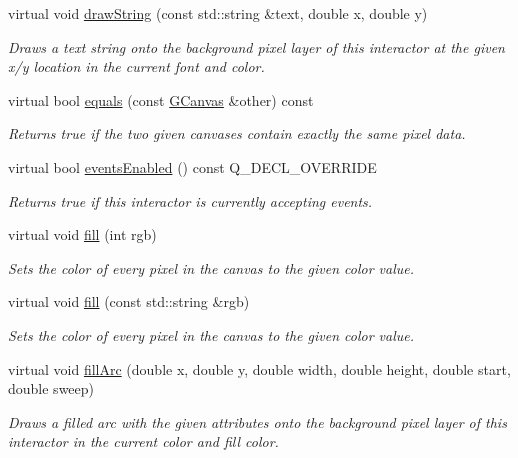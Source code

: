 \begin{DoxyCompactItemize}
virtual void \mbox{\hyperlink{classGDrawingSurface_ad4e8551a753a77135792bbee97013675}{draw\+String}} (const std\+::string \&text, double x, double y)
\begin{DoxyCompactList}\small\item\em Draws a text string onto the background pixel layer of this interactor at the given x/y location in the current font and color. \end{DoxyCompactList}\item 
virtual bool \mbox{\hyperlink{classGCanvas_a7cf0de4c4124b7de747b9cc17edd6ab9}{equals}} (const \mbox{\hyperlink{classGCanvas}{G\+Canvas}} \&other) const
\begin{DoxyCompactList}\small\item\em Returns true if the two given canvases contain exactly the same pixel data. \end{DoxyCompactList}\item 
virtual bool \mbox{\hyperlink{classGInteractor_ac05ba5b92e2e5146d416fe7f842a0969}{events\+Enabled}} () const Q\+\_\+\+D\+E\+C\+L\+\_\+\+O\+V\+E\+R\+R\+I\+DE
\begin{DoxyCompactList}\small\item\em Returns true if this interactor is currently accepting events. \end{DoxyCompactList}\item 
virtual void \mbox{\hyperlink{classGCanvas_acaf90d64e4fea8f776e722976aeb5070}{fill}} (int rgb)
\begin{DoxyCompactList}\small\item\em Sets the color of every pixel in the canvas to the given color value. \end{DoxyCompactList}\item 
virtual void \mbox{\hyperlink{classGCanvas_a02a5aa7f1474eeedd181e6e46b5eee65}{fill}} (const std\+::string \&rgb)
\begin{DoxyCompactList}\small\item\em Sets the color of every pixel in the canvas to the given color value. \end{DoxyCompactList}\item 
virtual void \mbox{\hyperlink{classGDrawingSurface_a228075ad18bd97b57f9956568c4773f3}{fill\+Arc}} (double x, double y, double width, double height, double start, double sweep)
\begin{DoxyCompactList}\small\item\em Draws a filled arc with the given attributes onto the background pixel layer of this interactor in the current color and fill color. \end{DoxyCompactList}\item 

\end{DoxyCompactItemize}

